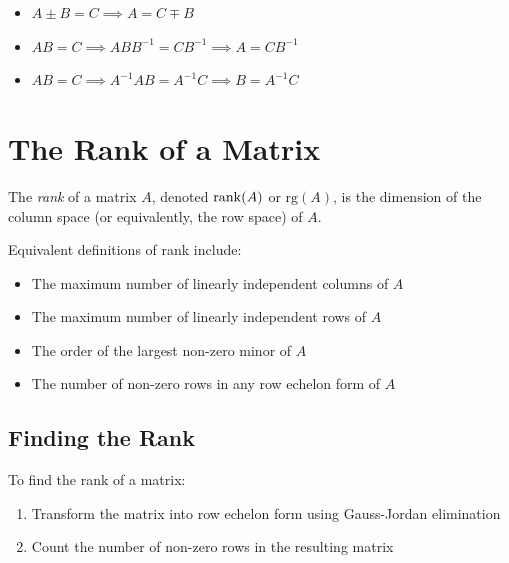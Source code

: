 \begin{itemize}

    \item \(A \pm B = C \implies A = C \mp B\)

    \item \(AB = C \implies ABB^{-1} = CB^{-1}  \implies A = CB^{-1}\)

    \item \(AB = C \implies A^{-1}AB = A^{-1}C  \implies B = A^{-1}C\)

\end{itemize}

\section{The Rank of a Matrix}

The \emph{rank} of a matrix \(A\), denoted \(\mathrm{rank}(A)\) or \(\text{rg}(A)\), is the dimension of the column space (or equivalently, the row space) of \(A\).

Equivalent definitions of rank include:

\begin{itemize}

    \item The maximum number of linearly independent columns of \(A\)

    \item The maximum number of linearly independent rows of \(A\)

    \item The order of the largest non-zero minor of \(A\)

    \item The number of non-zero rows in any row echelon form of \(A\)

\end{itemize}

\subsection{Finding the Rank}

To find the rank of a matrix:

\begin{enumerate}

    \item Transform the matrix into row echelon form using Gauss-Jordan elimination

    \item Count the number of non-zero rows in the resulting matrix

\end{enumerate}

